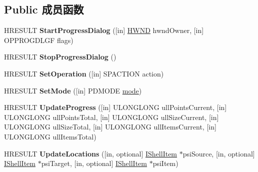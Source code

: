 \subsection*{Public 成员函数}
\begin{DoxyCompactItemize}
\item 
\mbox{\label{interface_i_operations_progress_dialog_ae90480b790aeab135a53464e4d90c575}} 
H\+R\+E\+S\+U\+LT {\bfseries Start\+Progress\+Dialog} (\mbox{[}in\mbox{]} \hyperlink{interfacevoid}{H\+W\+ND} hwnd\+Owner, \mbox{[}in\mbox{]} O\+P\+P\+R\+O\+G\+D\+L\+GF flags)
\item 
\mbox{\label{interface_i_operations_progress_dialog_a3ff652d92cd91939db17eb2a98cb9966}} 
H\+R\+E\+S\+U\+LT {\bfseries Stop\+Progress\+Dialog} ()
\item 
\mbox{\label{interface_i_operations_progress_dialog_a472a04412b53d7cc181c68fa26792e37}} 
H\+R\+E\+S\+U\+LT {\bfseries Set\+Operation} (\mbox{[}in\mbox{]} S\+P\+A\+C\+T\+I\+ON action)
\item 
\mbox{\label{interface_i_operations_progress_dialog_a298fdb20e6f312caa08b7b083b10f6b1}} 
H\+R\+E\+S\+U\+LT {\bfseries Set\+Mode} (\mbox{[}in\mbox{]} P\+D\+M\+O\+DE \hyperlink{interfacevoid}{mode})
\item 
\mbox{\label{interface_i_operations_progress_dialog_ae816b6dcdcc44a10b16f90e933482b74}} 
H\+R\+E\+S\+U\+LT {\bfseries Update\+Progress} (\mbox{[}in\mbox{]} U\+L\+O\+N\+G\+L\+O\+NG ull\+Points\+Current, \mbox{[}in\mbox{]} U\+L\+O\+N\+G\+L\+O\+NG ull\+Points\+Total, \mbox{[}in\mbox{]} U\+L\+O\+N\+G\+L\+O\+NG ull\+Size\+Current, \mbox{[}in\mbox{]} U\+L\+O\+N\+G\+L\+O\+NG ull\+Size\+Total, \mbox{[}in\mbox{]} U\+L\+O\+N\+G\+L\+O\+NG ull\+Items\+Current, \mbox{[}in\mbox{]} U\+L\+O\+N\+G\+L\+O\+NG ull\+Items\+Total)
\item 
\mbox{\label{interface_i_operations_progress_dialog_a73417be2f8197dda942ff26ff3dff305}} 
H\+R\+E\+S\+U\+LT {\bfseries Update\+Locations} (\mbox{[}in, optional\mbox{]} \hyperlink{interface_i_shell_item}{I\+Shell\+Item} $\ast$psi\+Source, \mbox{[}in, optional\mbox{]} \hyperlink{interface_i_shell_item}{I\+Shell\+Item} $\ast$psi\+Target, \mbox{[}in, optional\mbox{]} \hyperlink{interface_i_shell_item}{I\+Shell\+Item} $\ast$psi\+Item)

\end{DoxyCompactItemize}
